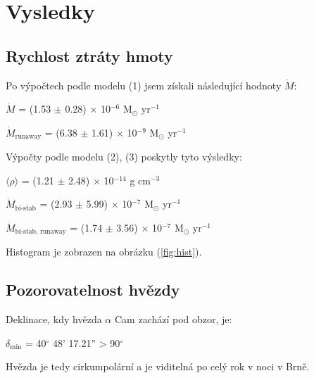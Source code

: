 \documentclass[a4paper,11pt]{article}
\begin{document}
    \begin{minipage}[t]{0.5\textwidth}
        \section{Vysledky}
            \subsection{Rychlost ztráty hmoty}
                Po výpočtech podle modelu (1) jsem získali následující hodnoty $\dot{M}$:
                \begin{center}
                    $\dot{M}$ = (1.53 $\pm$ 0.28) $\times$ 10$^{-6}$ M$_{\odot}$ yr$^{-1}$
                    \vspace{5pt}
                    \par $\dot{M}_{\text{runaway}}$ = (6.38 $\pm$ 1.61) $\times$ 10$^{-9}$ M$_{\odot}$ yr$^{-1}$
                \end{center}
                \par Výpočty podle modelu (2), (3) poskytly tyto výsledky:
                \begin{center}
                    $\langle \rho \rangle$ = (1.21 $\pm$ 2.48) $\times$ 10$^{-14}$ g cm$^{-3}$
                    \vspace{5pt}
                    \par $\dot{M}_{\text{bi-stab}}$ = (2.93 $\pm$ 5.99) $\times$ 10$^{-7}$ M$_{\odot}$ yr$^{-1}$
                    \vspace{5pt}
                    \par $\dot{M}_{\text{bi-stab, runaway}}$ = (1.74 $\pm$ 3.56) $\times$ 10$^{-7}$ M$_{\odot}$ yr$^{-1}$
                \end{center}
                \par Histogram je zobrazen na obrázku (\ref{fig:hist}).
            \subsection{Pozorovatelnost hvězdy}
                Deklinace, kdy hvězda $\alpha$ Cam zachází pod obzor, je:
                \begin{center}
                    $\delta_{\text{min}}$ = 40$^{\circ}$ 48' 17.21'' > 90$^{\circ}$
                \end{center}
                \par Hvězda je tedy cirkumpolární a je viditelná po celý rok v noci v Brně.

\end{minipage}
\end{document}
